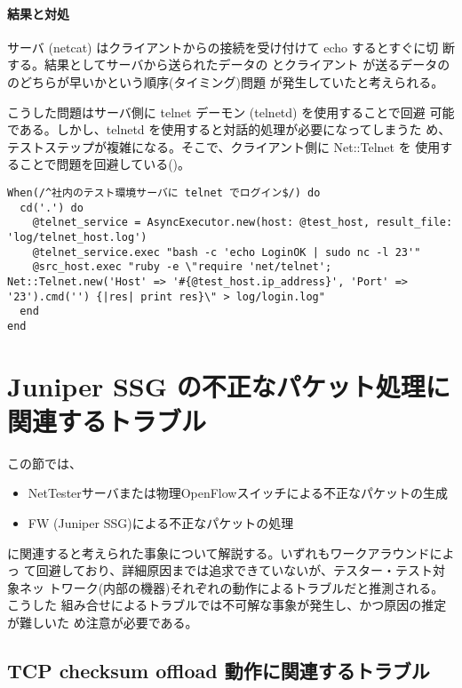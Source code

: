     \paragraph{結果と対処}
サーバ (netcat) はクライアントからの接続を受け付けて echo するとすぐに切
断する。結果としてサーバから送られたデータの  とクライアント
が送るデータの  のどちらが早いかという順序(タイミング)問題
が発生していたと考えられる。

こうした問題はサーバ側に telnet デーモン (telnetd) を使用することで回避
可能である。しかし、telnetd を使用すると対話的処理が必要になってしまうた
め、テストステップが複雑になる。そこで、クライアント側に Net::Telnet を
使用することで問題を回避している()。

\begin{lstlisting}[caption=修正後テストステップ,label=lst:telnet-step-new,linebackgroundcolor={\ifnum\value{lstnumber}=5 \color{green!30}\fi}]
When(/^社内のテスト環境サーバに telnet でログイン$/) do
  cd('.') do
    @telnet_service = AsyncExecutor.new(host: @test_host, result_file: 'log/telnet_host.log')
    @telnet_service.exec "bash -c 'echo LoginOK | sudo nc -l 23'"
    @src_host.exec "ruby -e \"require 'net/telnet'; Net::Telnet.new('Host' => '#{@test_host.ip_address}', 'Port' => '23').cmd('') {|res| print res}\" > log/login.log"
  end
end
\end{lstlisting}

 \section{Juniper SSG の不正なパケット処理に関連するトラブル}
 \label{sec:SSG-troubles}

この節では、
\begin{itemize}
 \item NetTesterサーバまたは物理OpenFlowスイッチによる不正なパケットの生成
 \item FW (Juniper SSG)による不正なパケットの処理
\end{itemize}
に関連すると考えられた事象について解説する。いずれもワークアラウンドによっ
て回避しており、詳細原因までは追求できていないが、テスター・テスト対象ネッ
トワーク(内部の機器)それぞれの動作によるトラブルだと推測される。こうした
組み合せによるトラブルでは不可解な事象が発生し、かつ原因の推定が難しいた
め注意が必要である。

 \subsection{TCP checksum offload 動作に関連するトラブル}
 \label{sec:tcp-checksum-offload-trouble}

